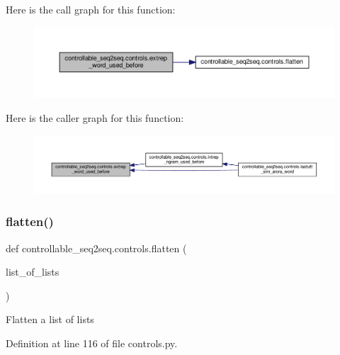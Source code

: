 Here is the call graph for this function\+:
\nopagebreak
\begin{figure}[H]
\begin{center}
\leavevmode
\includegraphics[width=350pt]{namespacecontrollable__seq2seq_1_1controls_ae434171bae1e0ae82095b6d54ad4cadd_cgraph}
\end{center}
\end{figure}
Here is the caller graph for this function\+:
\nopagebreak
\begin{figure}[H]
\begin{center}
\leavevmode
\includegraphics[width=350pt]{namespacecontrollable__seq2seq_1_1controls_ae434171bae1e0ae82095b6d54ad4cadd_icgraph}
\end{center}
\end{figure}
\mbox{\label{namespacecontrollable__seq2seq_1_1controls_a7c34984d4b5df8732e5e8176bf1663e3}} 
\subsubsection{\texorpdfstring{flatten()}{flatten()}}
{\footnotesize\ttfamily def controllable\+\_\+seq2seq.\+controls.\+flatten (\begin{DoxyParamCaption}\item[{}]{list\+\_\+of\+\_\+lists }\end{DoxyParamCaption})}

\begin{DoxyVerb}Flatten a list of lists\end{DoxyVerb}
 

Definition at line 116 of file controls.\+py.



